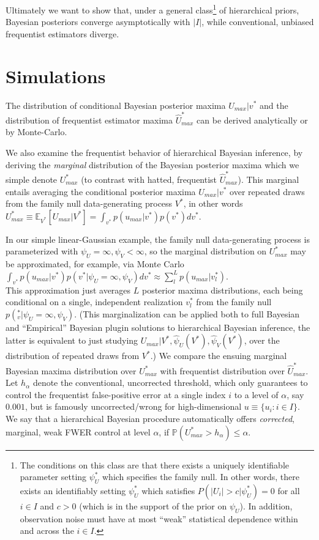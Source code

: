 \documentclass{article}
\begin{document}
Ultimately we want to show that, under a general class\footnote{The conditions on this class are that there exists a uniquely identifiable parameter setting $\psi_U^*$ which specifies the family null. In other words, there exists an identifiably setting $\psi_U^*$ which satisfies $P(|U_i|>c|\psi_U^*)=0$ for all $i \in I$ and $c>0$ (which is in the support of the prior on $\psi_U$). In addition, observation noise must have at most ``weak'' statistical dependence within and across the $i \in I$.} of hierarchical priors, Bayesian posteriors converge asymptotically with $|I|$, while conventional, unbiased frequentist estimators diverge. 

\section{Simulations}

The distribution of conditional Bayesian posterior maxima $U_{max}|v^*$ and the distribution of frequentist estimator maxima $\hat{U}^*_{max}$ can be derived analytically or by Monte-Carlo. 

We also examine the frequentist behavior of hierarchical Bayesian inference, by deriving the \textit{marginal} distribution of the Bayesian posterior maxima which we simple denote $U^*_{max}$ (to contrast with hatted, frequentist $\hat{U}^*_{max}$). This marginal entails averaging the conditional posterior maxima $U_{max}|v^*$ over repeated draws from the family null data-generating process $V^*$, in other words $U_{max}^* \equiv \mathbb{E}_{V^*}[U_{max}|V^*]=\int_{v^*}p(u_{max}|v^*)p(v^*)dv^*$. 

In our simple linear-Gaussian example, the family null data-generating process is parameterized with $\psi_U=\infty, \psi_V<\infty$, so the marginal distribution on $U_{max}^*$ may be approximated, for example, via Monte Carlo \\ 

$\int_{v^*}p(u_{max}|v^*)p(v^*|\psi_U=\infty, \psi_V)dv^* \approx \sum_l^L p(u_{max}|v^*_l)$. \\

This approximation just averages $L$ posterior maxima distributions, each being conditional on a single, independent realization $v^*_l$ from the family null $p(_v^*|\psi_U=\infty, \psi_V)$. (This marginalization can be applied both to full Bayesian and ``Empirical'' Bayesian plugin solutions to hierarchical Bayesian inference, the latter is equivalent to just studying $U_{max}|V^*,\hat{\psi}_U(V^*),\hat{\psi}_V(V^*)$, over the distribution of repeated draws from $V^*$.) We compare the ensuing marginal Bayesian maxima distribution over $U_{max}^*$  with frequentist distribution over $\hat{U}_{max}^*$.  Let $h_{\alpha}$ denote the conventional, uncorrected threshold, which only guarantees to control the frequentist false-positive error at a single index $i$ to a level of $\alpha$, say $0.001$, but is famously uncorrected/wrong for high-dimensional $u \equiv \{u_i: i \in I \}$. We say that a hierarchical Bayesian procedure automatically offers \textit{corrected}, marginal, weak FWER control at level $\alpha$, if $\mathbb{P}(U_{max}^*>h_{\alpha}) \leq \alpha$. 
\end{document}
